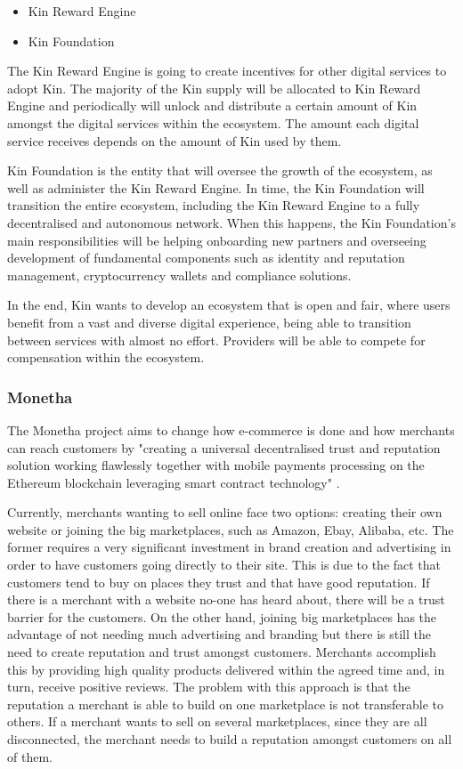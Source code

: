 \begin{itemize}
	\item Kin Reward Engine
	\item Kin Foundation
\end{itemize}

The Kin Reward Engine is going to create incentives for other digital services to adopt Kin. The majority of the Kin supply will be allocated to Kin Reward Engine and periodically will unlock and distribute a certain amount of Kin amongst the digital services within the ecosystem. The amount each digital service receives depends on the amount of Kin used by them.

Kin Foundation is the entity that will oversee the growth of the ecosystem, as well as administer the Kin Reward Engine. In time, the Kin Foundation will transition the entire ecosystem, including the Kin Reward Engine to a fully decentralised and autonomous network. When this happens, the Kin Foundation's main responsibilities will be helping onboarding new partners and overseeing development of fundamental components such as identity and reputation management, cryptocurrency wallets and compliance solutions.

In the end, Kin wants to develop an ecosystem that is open and fair, where users benefit from a vast and diverse digital experience, being able to transition between services with almost no effort. Providers will be able to compete for compensation within the ecosystem.

\subsubsection{Monetha}

The Monetha project aims to change how e-commerce is done and how merchants can reach customers by "creating a universal decentralised trust and reputation solution working flawlessly together with mobile payments processing on the Ethereum blockchain leveraging smart contract technology" \cite{MONETHA}.

Currently, merchants wanting to sell online face two options: creating their own website or joining the big marketplaces, such as Amazon, Ebay, Alibaba, etc. The former requires a very significant investment in brand creation and advertising in order to have customers going directly to their site. This is due to the fact that customers tend to buy on places they trust and that have good reputation. If there is a merchant with a website no-one has heard about, there will be a trust barrier for the customers. On the other hand, joining big marketplaces has the advantage of not needing much advertising and branding but there is still the need to create reputation and trust amongst customers. Merchants accomplish this by providing high quality products delivered within the agreed time and, in turn, receive positive reviews. The problem with this approach is that the reputation a merchant is able to build on one marketplace is not transferable to others. If a merchant wants to sell on several marketplaces, since they are all disconnected, the merchant needs to build a reputation amongst customers on all of them.

